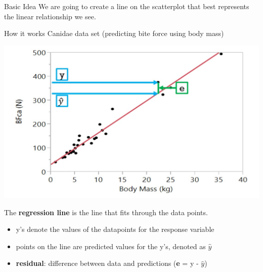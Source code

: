 \documentclass{beamer}
\begin{document}
\begin{frame}{Basic Idea}
We are going to create a line on the scatterplot that best represents the linear relationship we see. \vspace{4mm}

 \vspace{4mm}

\end{frame}



\begin{frame}{How it works}
Canidae data set (predicting bite force using body mass)
\begin{center}
    \includegraphics[scale=.4]{bite_force_regression_example.jpg}
\end{center}

The \textbf{regression line} is the line that fits through the data points.
\begin{itemize}
    \item y's denote the values of the datapoints for the response variable
    \item points on the line are predicted values for the y's, denoted as $\hat{y}$
    \item \textbf{residual}: difference between data and predictions (\textbf{e} = y - $\hat{y}$)
\end{itemize}
\end{frame}
\end{document}
